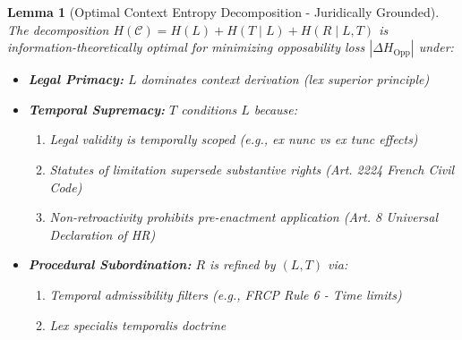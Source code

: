 \documentclass[preprint,12pt]{elsarticle}
\newtheorem{lemma}{Lemma}[section]
\begin{document}
            \begin{lemma}[Optimal Context Entropy Decomposition - Juridically Grounded]\label{lem:context_entropy_decomp}
                The decomposition $H(\mathcal{C}) = H(L) + H(T \mid L) + H(R \mid L, T)$ is information-theoretically optimal for minimizing opposability loss $|\Delta H_{\mathrm{Opp}}|$ under:
                \begin{itemize}
                    \item \textbf{Legal Primacy:} $L$ dominates context derivation (lex superior principle)
                    \item \textbf{Temporal Supremacy:} $T$ conditions $L$ because:
                        \begin{enumerate}
                            \item Legal validity is temporally scoped (e.g., \textit{ex nunc} vs \textit{ex tunc} effects)
                            \item Statutes of limitation supersede substantive rights (Art. 2224 French Civil Code)
                            \item Non-retroactivity prohibits pre-enactment application (Art. 8 Universal Declaration of HR)
                        \end{enumerate}
                    \item \textbf{Procedural Subordination:} $R$ is refined by $(L,T)$ via:
                        \begin{enumerate}
                            \item Temporal admissibility filters (e.g., FRCP Rule 6 - Time limits)
                            \item Lex specialis temporalis doctrine
                        \end{enumerate}
                \end{itemize}
                

\end{lemma}
\end{document}
